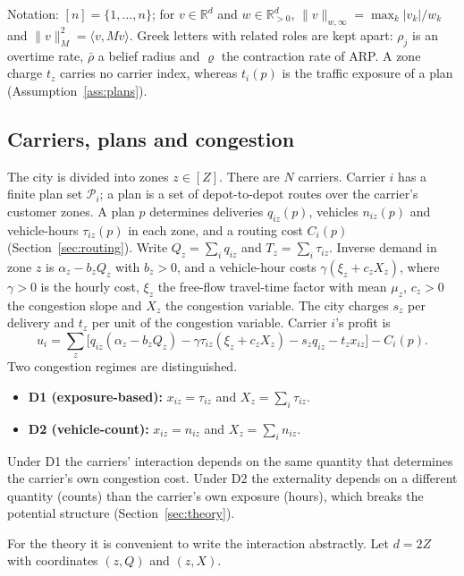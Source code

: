 \documentclass[preprint,12pt]{elsarticle}
\theoremstyle{definition}
\theoremstyle{remark}
\newcommand{\R}{\mathbb{R}}
\newcommand{\cP}{\mathcal{P}}
\newcommand{\ip}[2]{\langle #1,#2\rangle}
\begin{document}
Notation: $[n]=\{1,\dots,n\}$; for $v\in\R^d$ and $w\in\R^d_{>0}$, $\|v\|_{w,\infty}=\max_k|v_k|/w_k$ and $\|v\|_M^2=\ip{v}{Mv}$. Greek letters with related roles are kept apart: $\rho_j$ is an overtime rate, $\bar\rho$ a belief radius and $\varrho$ the contraction rate of ARP. A zone charge $t_z$ carries no carrier index, whereas $t_i(p)$ is the traffic exposure of a plan (Assumption~\ref{ass:plans}).

\subsection{Carriers, plans and congestion}

The city is divided into zones $z\in[Z]$. There are $N$ carriers. Carrier $i$ has a finite plan set $\cP_i$; a plan is a set of depot-to-depot routes over the carrier's customer zones. A plan $p$ determines deliveries $q_{iz}(p)$, vehicles $n_{iz}(p)$ and vehicle-hours $\tau_{iz}(p)$ in each zone, and a routing cost $C_i(p)$ (Section~\ref{sec:routing}). Write $Q_z=\sum_iq_{iz}$ and $T_z=\sum_i\tau_{iz}$. Inverse demand in zone $z$ is $\alpha_z-b_zQ_z$ with $b_z>0$, and a vehicle-hour costs $\gamma(\xi_z+c_zX_z)$, where $\gamma>0$ is the hourly cost, $\xi_z$ the free-flow travel-time factor with mean $\mu_z$, $c_z>0$ the congestion slope and $X_z$ the congestion variable. The city charges $s_z$ per delivery and $t_z$ per unit of the congestion variable. Carrier $i$'s profit is
\begin{equation}\label{eq:profit}
u_i=\sum_z\big[q_{iz}(\alpha_z-b_zQ_z)-\gamma\tau_{iz}(\xi_z+c_zX_z)-s_zq_{iz}-t_zx_{iz}\big]-C_i(p).
\end{equation}
Two congestion regimes are distinguished.
\begin{itemize}[leftmargin=*]
\item \textbf{D1 (exposure-based):} $x_{iz}=\tau_{iz}$ and $X_z=\sum_i\tau_{iz}$.
\item \textbf{D2 (vehicle-count):} $x_{iz}=n_{iz}$ and $X_z=\sum_in_{iz}$.
\end{itemize}
Under D1 the carriers' interaction depends on the same quantity that determines the carrier's own congestion cost. Under D2 the externality depends on a different quantity (counts) than the carrier's own exposure (hours), which breaks the potential structure (Section~\ref{sec:theory}).

For the theory it is convenient to write the interaction abstractly. Let $d=2Z$ with coordinates $(z,Q)$ and $(z,X)$.
\end{document}

